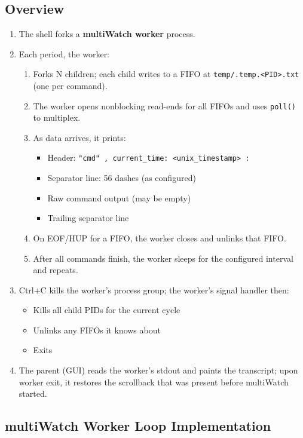 \documentclass[11pt,a4paper]{article}
\begin{document}
\subsection{Overview}
\begin{enumerate}[leftmargin=*]
\item The shell forks a \textbf{multiWatch worker} process.
\item Each period, the worker:
  \begin{enumerate}
    \item Forks N children; each child writes to a FIFO at \texttt{temp/.temp.\textless PID\textgreater.txt} (one per command).
    \item The worker opens nonblocking read-ends for all FIFOs and uses \texttt{poll()} to multiplex.
    \item As data arrives, it prints:
      \begin{itemize}
        \item Header: \texttt{"cmd" , current\_time: <unix\_timestamp> :}
        \item Separator line: 56 dashes (as configured)
        \item Raw command output (may be empty)
        \item Trailing separator line
      \end{itemize}
    \item On EOF/HUP for a FIFO, the worker closes and unlinks that FIFO.
    \item After all commands finish, the worker sleeps for the configured interval and repeats.
  \end{enumerate}
\item Ctrl+C kills the worker's process group; the worker's signal handler then:
  \begin{itemize}
    \item Kills all child PIDs for the current cycle
    \item Unlinks any FIFOs it knows about
    \item Exits
  \end{itemize}
\item The parent (GUI) reads the worker's stdout and paints the transcript; upon worker exit, it restores the scrollback that was present before multiWatch started.
\end{enumerate}

\subsection{multiWatch Worker Loop Implementation}
\end{document}
